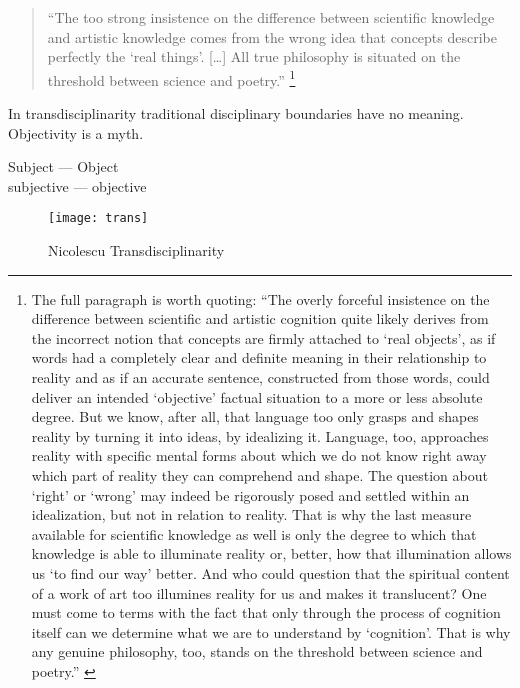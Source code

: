 \begin{quote}
  ``The too strong insistence on the difference between scientific knowledge and artistic knowledge comes from the wrong idea that concepts describe perfectly the `real things'. […] All true philosophy is situated on the threshold between science and poetry.'' \autocite[Heisenberg, cited in][p.22]{Nicolescu2010} \footnote{The full paragraph is worth quoting: ``The overly forceful insistence on the difference between scientific and artistic cognition quite likely derives from the incorrect notion that concepts are firmly attached to `real objects', as if words had a completely clear and definite meaning in their relationship to reality and as if an accurate sentence, constructed from those words, could deliver an intended `objective' factual situation to a more or less absolute degree. But we know, after all, that language too only grasps and shapes reality by turning it into ideas, by idealizing it. Language, too, approaches reality with specific mental forms about which we do not know right away which part of reality they can comprehend and shape. The question about `right' or `wrong' may indeed be rigorously posed and settled within an idealization, but not in relation to reality. That is why the last measure available for scientific knowledge as well is only the degree to which that knowledge is able to illuminate reality or, better, how that illumination allows us `to find our way' better. And who could question that the spiritual content of a work of art too illumines reality for us and makes it translucent? One must come to terms with the fact that only through the process of cognition itself can we determine what we are to understand by `cognition'. That is why any genuine philosophy, too, stands on the threshold between science and poetry.'' \autocite[Section 2, Chapter 6b]{Heisenberg1942}}
\end{quote}

In transdisciplinarity traditional disciplinary boundaries have no meaning. Objectivity is a myth.

\begin{fcom}
  Subject --- Object\\
  subjective --- objective
\end{fcom}


\begin{figure}
\centering
  \texttt{[image: trans]}
  \caption[Nicolescu Transdisciplinarity]{Nicolescu Transdisciplinarity}
\label{fig:trans}
\end{figure}


